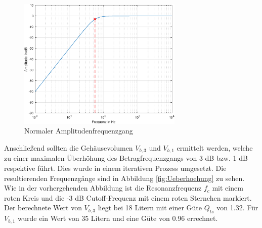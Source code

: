 \begin{figure}[H]
    \centering
    \includegraphics[width=0.7\textwidth]{Figures/Normaler_Frequenzgang.eps}
    \caption{Normaler Amplitudenfrequenzgang}
    \label{fig:Normaler_Frequenzgang}
\end{figure}%

Anschließend sollten die Gehäusevolumen $V_{b,3}$ und $V_{b,1}$ ermittelt werden, welche zu einer maximalen Überhöhung des Betragfrequenzgangs von 3 dB bzw. 1 dB respektive führt.
Dies wurde in einem iterativen Prozess umgesetzt.
Die resultierenden Frequenzgänge sind in Abbildung \ref{fig:Ueberhoehung} zu sehen.
Wie in der vorhergehenden Abbildung ist die Resonanzfrequenz $f_c$ mit einem roten Kreis und die -3 dB Cutoff-Frequenz mit einem roten Sternchen markiert.
Der berechnete Wert von $V_{b,3}$ liegt bei 18 Litern mit einer Güte $Q_{ts}$ von 1.32.
Für $V_{b,1}$ wurde ein Wert von 35 Litern und eine Güte von 0.96 errechnet.

